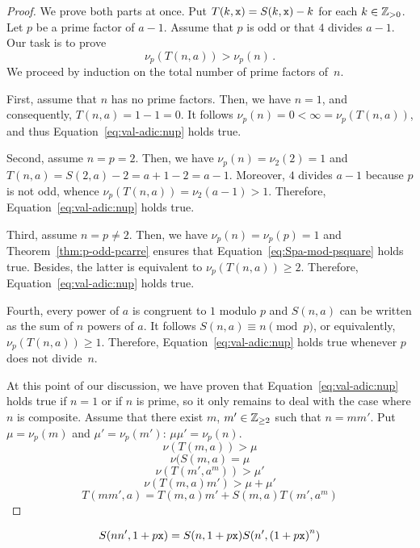  \begin{proof}
   We prove both parts at once.
   Put $T(k, \mathtt{x})  = S(k, \mathtt{x}) - k$ for each $k \in \mathbb{Z}_{> 0}$.
   Let $p$ be a prime factor of $a - 1$.
   Assume that $p$ is odd or that $4$ divides $a - 1$.
   Our task is to prove
   \begin{equation}  \label{eq:val-adic:nup}
   \nu_p(T(n, a)) > \nu_p(n) \, . 
   \end{equation}
   We proceed by induction on the total number of prime factors of~$n$.

   First, assume that $n$ has no prime factors.
   Then, we have $n = 1$, and consequently, $T(n, a)  = 1 - 1 = 0$.
   It follows $\nu_p(n) = 0 < \infty = \nu_p(T(n, a))$,
   and thus Equation~\eqref{eq:val-adic:nup} holds true.

   Second, assume $n = p = 2$.
   Then, we have
   $\nu_p(n) = \nu_2(2) = 1$
   and 
   $T(n, a) = S(2, a) - 2 = a + 1 - 2 = a - 1$.
   Moreover, $4$ divides $a - 1$ because $p$ is not odd,
   whence $\nu_p(T(n, a)) = \nu_2(a - 1) > 1$.
   Therefore, Equation~\eqref{eq:val-adic:nup} holds true.

   Third, assume $n = p \ne 2$.
   Then,
   we have $\nu_p(n) = \nu_p(p) = 1$
   and
   Theorem~\ref{thm:p-odd-pcarre} ensures that Equation~\eqref{eq:Spa-mod-psquare} holds true.
   Besides, the latter is equivalent to $\nu_p(T(n, a)) \ge 2$.
   Therefore, Equation~\eqref{eq:val-adic:nup} holds true.

   Fourth, every power of $a$ is congruent to $1$ modulo $p$
   and
   $S(n, a)$ can be written as the sum of $n$ powers of $a$.
   It follows $S(n, a) \equiv n \pmod {p}$, or equivalently, $\nu_p(T(n, a)) \ge 1$.
   Therefore, Equation~\eqref{eq:val-adic:nup} holds true whenever $p$ does not divide~$n$.
 
   At this point of our discussion,
   we have proven that Equation~\eqref{eq:val-adic:nup} holds true if $n = 1$ or if $n$ is prime,
   so it only remains to deal with the case where $n$ is composite.
   Assume that there exist $m$, $m' \in \mathbb{Z}_{\ge 2}$ such that $n = mm'$.
   Put $\mu = \nu_p(m)$ and $\mu' = \nu_p(m')$: $\mu\mu' = \nu_p(n)$.
   $$
   \nu(T(m, a)) > \mu
   $$
   $$
   \nu(S(m, a) = \mu
   $$
   $$
   \nu(T(m', a^m)) > \mu'
   $$
   $$
   \nu(T(m, a) m') > \mu + \mu' 
   $$
   $$
   T(mm', a) = T(m, a) m' +  S(m, a) T(m', a^m) 
   $$
 \end{proof}

   $$
   S(nn', 1 + p \mathtt{x}) 
   =
   S(n, 1 + p \mathtt{x})  S(n', {(1 + p \mathtt{x})}^n)
   $$

 